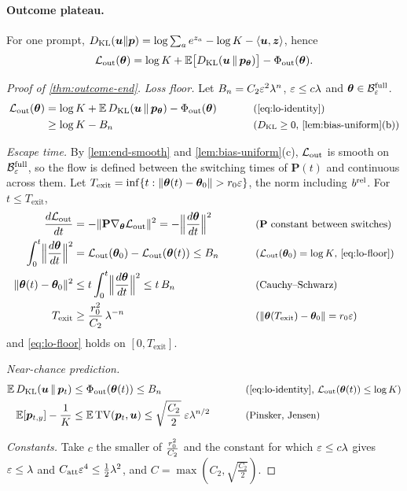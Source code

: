 \paragraph{Outcome plateau.}\label{app:end} For one prompt, $D_{\mathrm{KL}}(\bm u\|\bm p)=\log\sum_ae^{z_a}-\log K-\langle\bm u,\bm z\rangle$, hence
\begin{equation}
 \mathcal L_{\mathrm{out}}(\bm\theta)=\log K+\mathbb E\bigl[D_{\mathrm{KL}}(\bm u\,\|\,\bm p_{\bm\theta})\bigr]-\Phi_{\mathrm{out}}(\bm\theta).
 \label{eq:lo-identity}
\end{equation}

\begin{proof}[Proof of \cref{thm:outcome-end}]
\emph{Loss floor.} Let $B_n=C_2\varepsilon^2\lambda^n$, $\varepsilon\le c\lambda$ and $\bm\theta\in\mathcal B^{\mathrm{full}}_{\varepsilon}$.
\begin{alignat}{2}
 \Lout(\bm\theta)&=\log K+\E\,\KL(\bm u\,\|\,\bm p_{\bm\theta})-\outcredit(\bm\theta) &\qquad& \why{\cref{eq:lo-identity}}\nonumber\\
 &\ge\log K-B_n && \why{$\KL\ge0$, \cref{lem:bias-uniform}(b)}\label{eq:lo-floor}
\end{alignat}

\emph{Escape time.} By \cref{lem:end-smooth} and \cref{lem:bias-uniform}(c), $\mathcal L_{\mathrm{out}}$ is smooth on $\mathcal B^{\mathrm{full}}_{\varepsilon}$, so the flow is defined between the
switching times of $\mathbf P(t)$ and continuous across them. Let $T_{\mathrm{exit}}=\inf\{t:\|\bm\theta(t)-\bm\theta_0\|>\ballradius\initscale\}$, the norm
including $b^{\mathrm{rel}}$. For $t\le T_{\mathrm{exit}}$,
\begin{alignat*}{2}
 \ddt{\Lout}&=-\|\mathbf P\nabla_{\bm\theta}\Lout\|^2=-\Bigl\|\ddt{\bm\theta}\Bigr\|^2 &\qquad& \why{$\mathbf P$ constant between switches}\\
 \int_0^t\Bigl\|\ddt{\bm\theta}\Bigr\|^2&=\Lout(\bm\theta_0)-\Lout(\bm\theta(t))\le B_n && \why{$\Lout(\bm\theta_0)=\log K$, \cref{eq:lo-floor}}\\
 \|\bm\theta(t)-\bm\theta_0\|^2&\le t\int_0^t\Bigl\|\ddt{\bm\theta}\Bigr\|^2\le t\,B_n && \why{Cauchy--Schwarz}\\
 T_{\mathrm{exit}}&\ge\frac{\ballradius^2}{C_2}\,\mixrate^{-n} && \why{$\|\bm\theta(T_{\mathrm{exit}})-\bm\theta_0\|=\ballradius\initscale$}
\end{alignat*}
and \cref{eq:lo-floor} holds on $[0,T_{\mathrm{exit}}]$.

\emph{Near-chance prediction.}
\begin{alignat*}{2}
 \E\,\KL(\bm u\,\|\,\bm p_t)&\le\outcredit(\bm\theta(t))\le B_n &\qquad& \why{\cref{eq:lo-identity}, $\Lout(\bm\theta(t))\le\log K$}\\
 \E[\bm p_{t,y}]-\tfrac{1}{K}&\le\E\,\mathrm{TV}(\bm p_t,\bm u)\le\sqrt{\frac{C_2}{2}}\;\initscale\mixrate^{n/2} && \why{Pinsker, Jensen}
\end{alignat*}

\emph{Constants.} Take $c$ the smaller of $\frac{r_0^2}{C_2}$ and the constant for which $\varepsilon\le c\lambda$ gives $\varepsilon\le\lambda$ and
$C_{\mathrm{att}}\varepsilon^4\le\frac{1}{2}\lambda^2$, and $C=\max(C_2,\sqrt{\frac{C_2}{2}})$.
\end{proof}
